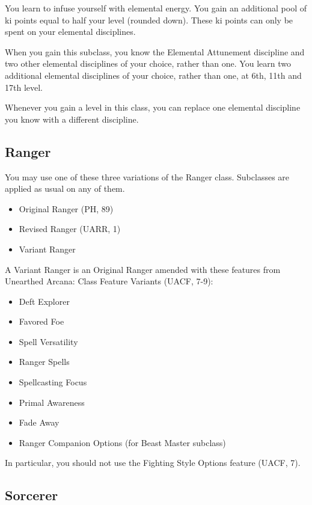 \documentclass[letterpaper,twocolumn,openany,nodeprecatedcode]{dndbook}
\begin{document}
You learn to infuse yourself with elemental energy. You gain an additional pool of ki points equal to half your level (rounded down). These ki points can only be spent on your elemental disciplines.

When you gain this subclass, you know the Elemental Attunement discipline and two other elemental disciplines of your choice, rather than one. You learn two additional elemental disciplines of your choice, rather than one, at 6th, 11th and 17th level.

Whenever you gain a level in this class, you can replace one elemental discipline you know with a different discipline.

\subsection{Ranger}

You may use one of these three variations of the Ranger class. Subclasses are applied as usual on any of them.

\begin{itemize}
    \item Original Ranger (PH, 89)
    \item Revised Ranger (UARR, 1)
    \item Variant Ranger
\end{itemize}

\label{balance-class-ranger-variant}
A Variant Ranger is an Original Ranger amended with these features from Unearthed Arcana: Class Feature Variants (UACF, 7-9):

\begin{itemize}
    \item Deft Explorer
    \item Favored Foe
    \item Spell Versatility
    \item Ranger Spells
    \item Spellcasting Focus
    \item Primal Awareness
    \item Fade Away
    \item Ranger Companion Options (for Beast Master subclass)
\end{itemize}

In particular, you should not use the Fighting Style Options feature (UACF, 7).


\subsection{Sorcerer}
\end{document}
